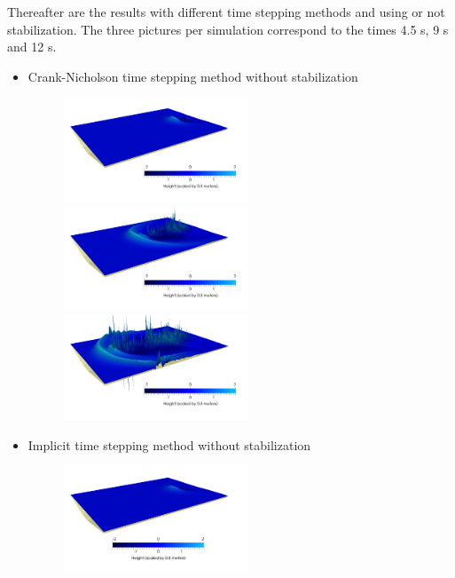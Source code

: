 \documentclass[11pt,a4paper]{article}
\begin{document}
Thereafter are the results with different time stepping methods and using or not stabilization. The three pictures per simulation correspond to the times 4.5 s, 9 s and 12 s.
\begin{itemize}
	\item Crank-Nicholson time stepping method without stabilization
	\begin{figure}[!h]
		\begin{minipage}[t]{0.3\linewidth}
			\centering
			\includegraphics[width=5.5cm]{CNNoStabilized150.png}
		\end{minipage}
		\begin{minipage}[t]{0.3\linewidth}
			\centering
			\includegraphics[width=5.5cm]{CNNoStabilized300.png}
		\end{minipage}
		\begin{minipage}[t]{0.3\linewidth}
			\centering
			\includegraphics[width=5.5cm]{CNNoStabilized400.png}
		\end{minipage}
	\end{figure}
	\item Implicit time stepping method without stabilization
	\begin{figure}[!h]
		\begin{minipage}[t]{0.3\linewidth}
			\centering
			\includegraphics[width=5.5cm]{ImplicitNoStabilized150.png}

\end{minipage}
\end{figure}
\end{itemize}
\end{document}
